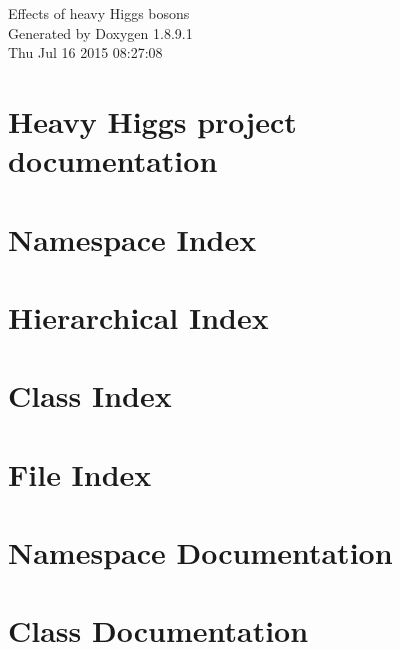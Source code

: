 \documentclass[twoside]{book}
\newcommand{\+}{\discretionary{\mbox{\scriptsize$\hookleftarrow$}}{}{}}
\newcommand{\clearemptydoublepage}{%
  \newpage{\pagestyle{empty}\cleardoublepage}%
}
\begin{document}
\hypersetup{pageanchor=false,
             bookmarks=true,
             bookmarksnumbered=true,
             pdfencoding=unicode
            }
\begin{titlepage}
\vspace*{7cm}
\begin{center}%
{\Large Effects of heavy Higgs bosons }\\
\vspace*{1cm}
{\large Generated by Doxygen 1.8.9.1}\\
\vspace*{0.5cm}
{\small Thu Jul 16 2015 08:27:08}\\
\end{center}
\end{titlepage}
\clearemptydoublepage
\tableofcontents
\clearemptydoublepage
{}
\hypersetup{pageanchor=true}

\chapter{Heavy Higgs project documentation}
\label{index}\hypertarget{index}{}
\chapter{Namespace Index}

\chapter{Hierarchical Index}

\chapter{Class Index}

\chapter{File Index}

\chapter{Namespace Documentation}



\chapter{Class Documentation}

























\end{document}
